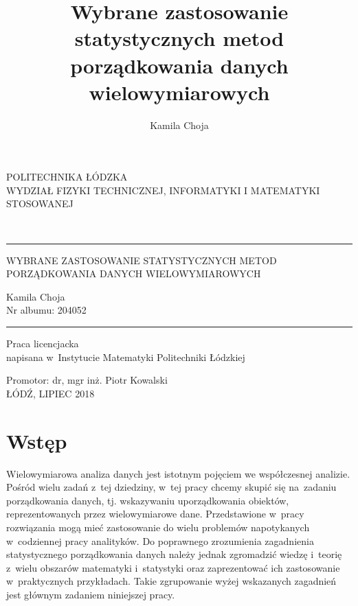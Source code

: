 \documentclass[12pt,a4paper]{report}
\author{Kamila Choja}
\title{Wybrane zastosowanie statystycznych metod porządkowania danych wielowymiarowych}
\begin{document}
\begin{titlepage}
\begin{center}
        \vspace*{1cm}
        {\large POLITECHNIKA ŁÓDZKA}\\
       \vspace*{1cm}
        {\large WYDZIAŁ FIZYKI TECHNICZNEJ, INFORMATYKI I MATEMATYKI STOSOWANEJ}\\
        \vspace*{2cm}
    \end{center}        
        
\\
\vspace*{0.3cm}
\hspace*{0.3cm}
  
\begin{center}
\rule{\textwidth}{0.5pt}

\vspace*{0.5cm}
   
{\large WYBRANE ZASTOSOWANIE STATYSTYCZNYCH METOD\\ }
{\large PORZĄDKOWANIA DANYCH WIELOWYMIAROWYCH\\}
\vspace*{1cm}


\begin{flushright}
Kamila Choja\\
Nr albumu: 204052 
 \end{flushright}
\rule{\textwidth}{0.5pt}

Praca licencjacka\\
napisana w~Instytucie Matematyki Politechniki Łódzkiej\\

\vspace*{2cm}

Promotor: dr, mgr inż. Piotr Kowalski\\
\vfill
ŁÓDŹ, LIPIEC 2018


     \end{center}   
\end{titlepage}

\tableofcontents

\chapter{Wstęp}
Wielowymiarowa analiza danych jest istotnym pojęciem we współczesnej analizie. Pośród wielu zadań z~tej dziedziny, w~tej pracy chcemy skupić się na~zadaniu porządkowania danych, tj. wskazywaniu uporządkowania obiektów, reprezentowanych przez wielowymiarowe dane. Przedstawione w~pracy rozwiązania mogą mieć zastosowanie do wielu problemów napotykanych w~codziennej pracy analityków. Do poprawnego zrozumienia zagadnienia statystycznego porządkowania danych należy jednak zgromadzić wiedzę i~teorię z~wielu obszarów matematyki i~statystyki oraz zaprezentować ich zastosowanie w~praktycznych przykładach. Takie zgrupowanie wyżej wskazanych zagadnień jest głównym zadaniem niniejszej pracy. 
\end{document}
